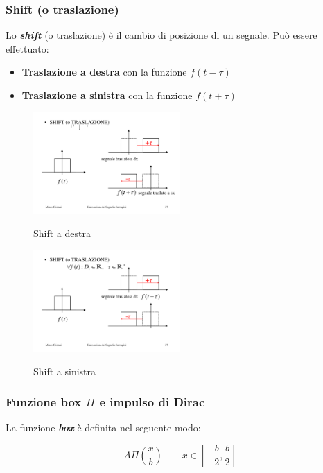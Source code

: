 \documentclass[a4paper]{article}
\begin{document}
	\newpage
	
	\subsubsection{Shift (o traslazione)}
	
	Lo \textbf{\emph{shift}} (o traslazione) è il cambio di posizione di un segnale. Può essere effettuato:
	
	\begin{itemize}
		\item \textbf{Traslazione a destra} con la funzione $f(t-\tau)$
		\item \textbf{Traslazione a sinistra} con la funzione $f(t+\tau)$
	\end{itemize}
	
	\begin{figure}[!htp]
		\centering
		\includegraphics[width=0.5\textwidth]{img/op_shift_dx.pdf}\label{op_shift_dx}
		\caption{Shift a destra}
		\includegraphics[width=0.5\textwidth]{img/op_shift_sx.pdf}\label{op_shift_sx}
		\caption{Shift a sinistra}
	\end{figure}

	\newpage
	
	\subsubsection{Funzione box $\Pi$ e impulso di Dirac}
	
	La funzione \textbf{\emph{box}} è definita nel seguente modo:
	
	\begin{equation*}
		A \Pi(\dfrac{x}{b}) \hspace{2em} x\in\left[-\dfrac{b}{2}, \dfrac{b}{2}\right]
	\end{equation*}
\end{document}
